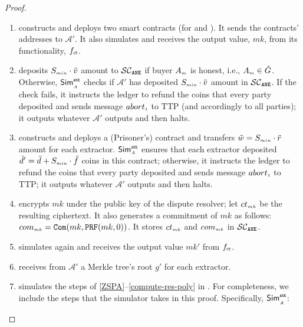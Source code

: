 \begin{proof}
\begin{enumerate}
%
\item constructs and deploys two smart contracts (for \fpsi and \epsi). It sends the contracts' addresses to $\mathcal{A}'$.  It also simulates \ct and receives the output value, $ {mk}$, from its functionality, $f_{\scriptscriptstyle \mathtt{CT}}$.
%
\item\label{sim::case1-buyer-deposit} deposits $S_{\scriptscriptstyle min}\cdot \ddot{v}$ amount to $\mathcal{SC}_{\mathtt{ANE}}$  if buyer $A_{\scriptscriptstyle m}$ is honest, i.e.,  $A_{\scriptscriptstyle m}\in \hat G$. Otherwise, $\mathsf{Sim}^{\scriptscriptstyle \mathtt{ANE}}_{\scriptscriptstyle _{\scriptscriptstyle A}}$ checks if  $\mathcal{A}'$ has deposited $S_{\scriptscriptstyle min}\cdot \ddot{v}$ amount in $\mathcal{SC}_{\mathtt{ANE}}$. If the check fails, it instructs the ledger to refund the coins that every party deposited and sends message $abort_{\scriptscriptstyle 1}$ to TTP (and accordingly to all parties); it outputs whatever $\mathcal{A}'$ outputs and then halts.


%
\item\label{e-psi::deploy-prisoners} constructs and deploys a (Prisoner's) contract and transfers $\ddot{w}=S_{\scriptscriptstyle min}\cdot \ddot{r}$  amount for each extractor. $\mathsf{Sim}^{\scriptscriptstyle \mathtt{ANE}}_{\scriptscriptstyle A}$ ensures that each extractor deposited $\ddot{d}'=\ddot{d}+S_{\scriptscriptstyle min}\cdot \ddot{f}$ coins in this contract; otherwise, it instructs the ledger to refund the coins that every party deposited and sends message $abort_{\scriptscriptstyle 1}$ to TTP; it outputs whatever $\mathcal{A}'$ outputs and then halts.

 
%
\item encrypts $ mk$ under the public key of the dispute resolver;  let $ct_{\scriptscriptstyle {mk}}$ be the resulting ciphertext.   It also generates a commitment of ${mk}$ as follows: $ com_{\scriptscriptstyle {mk}}=\mathtt{Com}({mk}, \mathtt{PRF}({mk}, 0))$. It stores $ct_{\scriptscriptstyle {mk}}$  and ${com}_{\scriptscriptstyle {mk}}$ in $\mathcal{SC}_{\mathtt{ANE}}$. 
%
\item  simulates \ct again and receives the output value $ {mk}'$ from  $f_{\scriptscriptstyle \mathtt{CT}}$.

\item\label{sim::case1-merkle-tree-root} receives from $\mathcal{A}'$ a Merkle tree's root $g'$ for each extractor. 


\item\label{sim::case1-F-PSI} simulates the steps of \ref{ZSPA}--\ref{compute-res-poly} in \fpsi. For completeness, we include the steps that the simulator takes in this proof. Specifically, $\mathsf{Sim}^{\scriptscriptstyle \mathtt{ANE}}_{\scriptscriptstyle _{\scriptscriptstyle A}}$:


\end{enumerate}
\end{proof}

